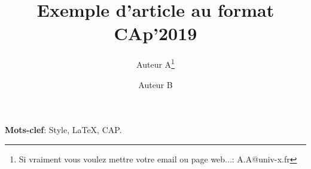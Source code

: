 \documentclass[twocolumn]{article}
\title{Exemple d'article au format CAp'2019}
\author[1]{Auteur A\thanks{Si vraiment vous voulez mettre votre email
    ou page web...: A.A@univ-x.fr}}
\author[2]{Auteur B}
\affil[1]{Université X, CNRS}
\affil[2]{Université Y, CNRS et INRIA}
\begin{document}
\maketitle



\medskip

\noindent\textbf{Mots-clef}: Style, \LaTeX, CAP.










\end{document}
